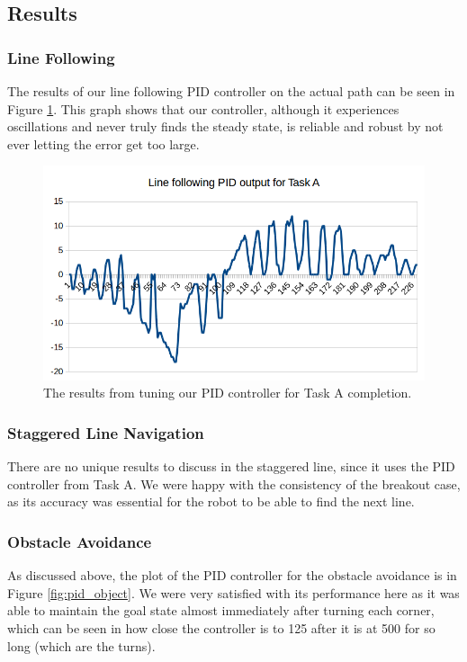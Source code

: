 \documentclass[12pt]{article}
\begin{document}
\subsection{Results}

\subsubsection{Line Following}

The results of our line following PID controller on the actual path can be seen in Figure \ref{fig:taskA_plot}. This graph shows that our controller, although it experiences oscillations and never truly finds the steady state, is reliable and robust by not ever letting the error get too large.

\begin{figure}
	\includegraphics[width=\linewidth]{pid_taskA}
	\caption{The results from tuning our PID controller for Task A completion.}
	\label{fig:taskA_plot}
\end{figure}

\subsubsection{Staggered Line Navigation}

There are no unique results to discuss in the staggered line, since it uses the PID controller from Task A. We were happy with the consistency of the breakout case, as its accuracy was essential for the robot to be able to find the next line.

\subsubsection{Obstacle Avoidance}

As discussed above, the plot of the PID controller for the obstacle avoidance is in Figure \ref{fig:pid_object}. We were very satisfied with its performance here as it was able to maintain the goal state almost immediately after turning each corner, which can be seen in how close the controller is to 125 after it is at 500 for so long (which are the turns).
\end{document}
